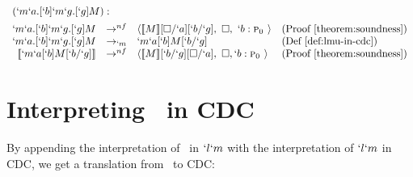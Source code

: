 \begin{Proof}
\[
\begin{array}{rcllll}
\prooflabel{(`m`a.[`b]`m`g.[`g]M)} \\
  `m`a.[`b]`m`g.[`g]M & \to^{nf} & \langle \tr{M}[\square/`a][`b/`g],\ \square,\ `b:\gp \rangle
          & \text{(Proof \ref{theorem:soundness})} \\
  `m`a.[`b]`m`g.[`g]M & \to_{`m} & `m`a[`b]M[`b/`g]
          & \text{(Def \ref{def:lmu-in-cdc})} \\
  \tr{`m`a[`b]M[`b/`g]} & \to^{nf} & \langle \tr{M}[`b/`g][\square/`a],\ \square, `b:\gp \rangle
          & \text{(Proof \ref{theorem:soundness})}
\end{array}
\]
\end{Proof}


\section{Interpreting \ltry\ in CDC}

  By appending the interpretation of \ltry\ in $`l`m$ with the interpretation of
  $`l`m$ in CDC, we get a translation from \ltry\ to CDC:

